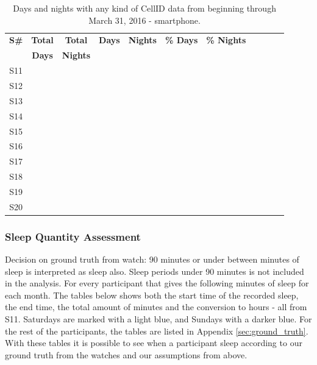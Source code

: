 \documentclass[12pt]{article} %
\begin{document}
\begin{table}[H]
\center
\begin{footnotesize}
	\begin{tabular}{| c | c | c || c | c | c | c | c | c | c | c |}
	\hline
	\textbf{S\#} & \textbf{Total} & \textbf{Total} & \textbf{Days} & \textbf{Nights} & \textbf{\% Days} & \textbf{\% Nights}\\
	& \textbf{Days} & \textbf{Nights} & & & &\\
	\hline
	S11 & & & & & &\\
	S12 & & & & & & \\
	S13 & & & & & & \\
	S14 & & & & & & \\
	S15 & & & & & & \\
	S16 & & & & & & \\
	S17 & & & & & & \\
	S18 & & & & & & \\
	S19 & & & & & & \\
	S20 & & & & & & \\
	\hline
	\end{tabular}
	\caption{Days and nights with any kind of CellID data from beginning through March 31, 2016 - smartphone.}
	\label{tab:daysNightsExp1Phone}
\end{footnotesize}
\end{table}


\subsubsection{Sleep Quantity Assessment}
Decision on ground truth from watch: 90 minutes or under between minutes of sleep is interpreted as sleep also. Sleep periods under 90 minutes is not included in the analysis. For every participant that gives the following minutes of sleep for each month. The tables below shows both the start time of the recorded sleep, the end time, the total amount of minutes and the conversion to hours - all from S11. Saturdays are marked with a light blue, and Sundays with a darker blue. For the rest of the participants, the tables are listed in Appendix \ref{sec:ground_truth}. \\

With these tables it is possible to see when a participant sleep according to our ground truth from the watches and our assumptions from above. 
\end{document}
